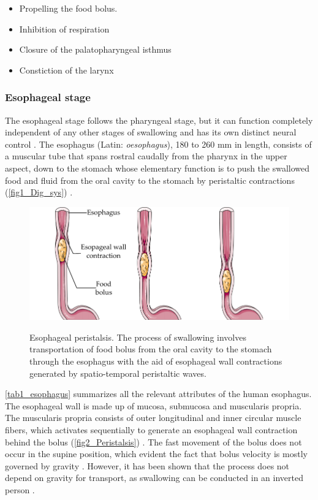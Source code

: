 \begin{itemize}
	\item  Propelling the food bolus.
	\item  Inhibition of respiration
	\item  Closure of the palatopharyngeal isthmus
	\item  Constiction of the larynx    
\end{itemize}

\subsubsection{Esophageal stage}

The esophageal stage follows the pharyngeal stage, but it can function completely independent of any other stages of swallowing and has its own distinct neural control \cite{Miller1986, Miller1987, lang2009brain, Dodds1989}. The esophagus (Latin: \textit{oesophagus}), 180 to 260 mm in length, consists of a muscular tube that spans rostral caudally from the pharynx in the upper aspect, down to the stomach whose elementary function is to push the swallowed food and fluid from the oral cavity to the stomach by peristaltic contractions (\autoref{fig1_Dig_sys}) \cite{brasseur1987fluid,Miller1986,chen2009food}. 


\begin{figure}[bth]
	\myfloatalign
	{\includegraphics[width=\linewidth]{images/Ch2/fig2_Peristalsis}} \quad
	\caption[Esophageal peristalsis]{Esophageal peristalsis. The process of swallowing involves transportation of food bolus from the oral cavity to the stomach through the esophagus with the aid of esophageal wall contractions generated by spatio-temporal peristaltic waves.}\label{fig2_Peristalsis}
\end{figure}

\autoref{tab1_esophagus} summarizes all the relevant attributes of the human esophagus. The esophageal wall is made up of mucosa, submucosa and muscularis propria. The muscularis propria consists of outer longitudinal and inner circular muscle fibers, which activates sequentially to generate an esophageal wall contraction behind the bolus (\autoref{fig2_Peristalsis}) \cite{brasseur1987fluid,Miller1986,Miller1987,Dodds1989}. The fast movement of the bolus does not occur in the supine position, which evident the fact that bolus velocity is mostly governed by gravity \cite{mashimo2006physiology,brasseur1987fluid}. However, it has been shown that the process does not depend on gravity for
transport, as swallowing can be conducted in an inverted person \cite{chen2009food}. 

